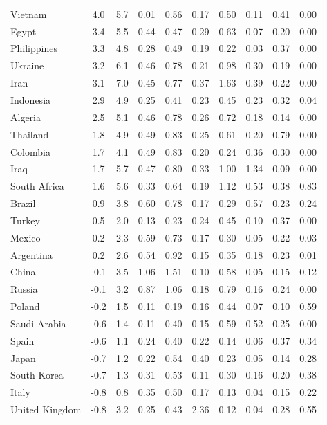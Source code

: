 \documentclass[12pt,english]{article}
\begin{document}
\begin{bibunit}
\begin{table}[!h]
{\begin{tabular}[t]{lccccccccc}
Vietnam & 4.0 & 5.7 & 0.01 & 0.56 & 0.17 & 0.50 & 0.11 & 0.41 & 0.00\\
Egypt & 3.4 & 5.5 & 0.44 & 0.47 & 0.29 & 0.63 & 0.07 & 0.20 & 0.00\\
Philippines & 3.3 & 4.8 & 0.28 & 0.49 & 0.19 & 0.22 & 0.03 & 0.37 & 0.00\\
Ukraine & 3.2 & 6.1 & 0.46 & 0.78 & 0.21 & 0.98 & 0.30 & 0.19 & 0.00\\
Iran & 3.1 & 7.0 & 0.45 & 0.77 & 0.37 & 1.63 & 0.39 & 0.22 & 0.00\\
Indonesia & 2.9 & 4.9 & 0.25 & 0.41 & 0.23 & 0.45 & 0.23 & 0.32 & 0.04\\
Algeria & 2.5 & 5.1 & 0.46 & 0.78 & 0.26 & 0.72 & 0.18 & 0.14 & 0.00\\
Thailand & 1.8 & 4.9 & 0.49 & 0.83 & 0.25 & 0.61 & 0.20 & 0.79 & 0.00\\
Colombia & 1.7 & 4.1 & 0.49 & 0.83 & 0.20 & 0.24 & 0.36 & 0.30 & 0.00\\
Iraq & 1.7 & 5.7 & 0.47 & 0.80 & 0.33 & 1.00 & 1.34 & 0.09 & 0.00\\
South Africa & 1.6 & 5.6 & 0.33 & 0.64 & 0.19 & 1.12 & 0.53 & 0.38 & 0.83\\
Brazil & 0.9 & 3.8 & 0.60 & 0.78 & 0.17 & 0.29 & 0.57 & 0.23 & 0.24\\
Turkey & 0.5 & 2.0 & 0.13 & 0.23 & 0.24 & 0.45 & 0.10 & 0.37 & 0.00\\
Mexico & 0.2 & 2.3 & 0.59 & 0.73 & 0.17 & 0.30 & 0.05 & 0.22 & 0.03\\
Argentina & 0.2 & 2.6 & 0.54 & 0.92 & 0.15 & 0.35 & 0.18 & 0.23 & 0.01\\
China & -0.1 & 3.5 & 1.06 & 1.51 & 0.10 & 0.58 & 0.05 & 0.15 & 0.12\\
Russia & -0.1 & 3.2 & 0.87 & 1.06 & 0.18 & 0.79 & 0.16 & 0.24 & 0.00\\
Poland & -0.2 & 1.5 & 0.11 & 0.19 & 0.16 & 0.44 & 0.07 & 0.10 & 0.59\\
Saudi Arabia & -0.6 & 1.4 & 0.11 & 0.40 & 0.15 & 0.59 & 0.52 & 0.25 & 0.00\\
Spain & -0.6 & 1.1 & 0.24 & 0.40 & 0.22 & 0.14 & 0.06 & 0.37 & 0.34\\
Japan & -0.7 & 1.2 & 0.22 & 0.54 & 0.40 & 0.23 & 0.05 & 0.14 & 0.28\\
South Korea & -0.7 & 1.3 & 0.31 & 0.53 & 0.11 & 0.30 & 0.16 & 0.20 & 0.38\\
Italy & -0.8 & 0.8 & 0.35 & 0.50 & 0.17 & 0.13 & 0.04 & 0.15 & 0.22\\
United Kingdom & -0.8 & 3.2 & 0.25 & 0.43 & 2.36 & 0.12 & 0.04 & 0.28 & 0.55\\

\end{tabular}}
\end{table}
\end{bibunit}
\end{document}
